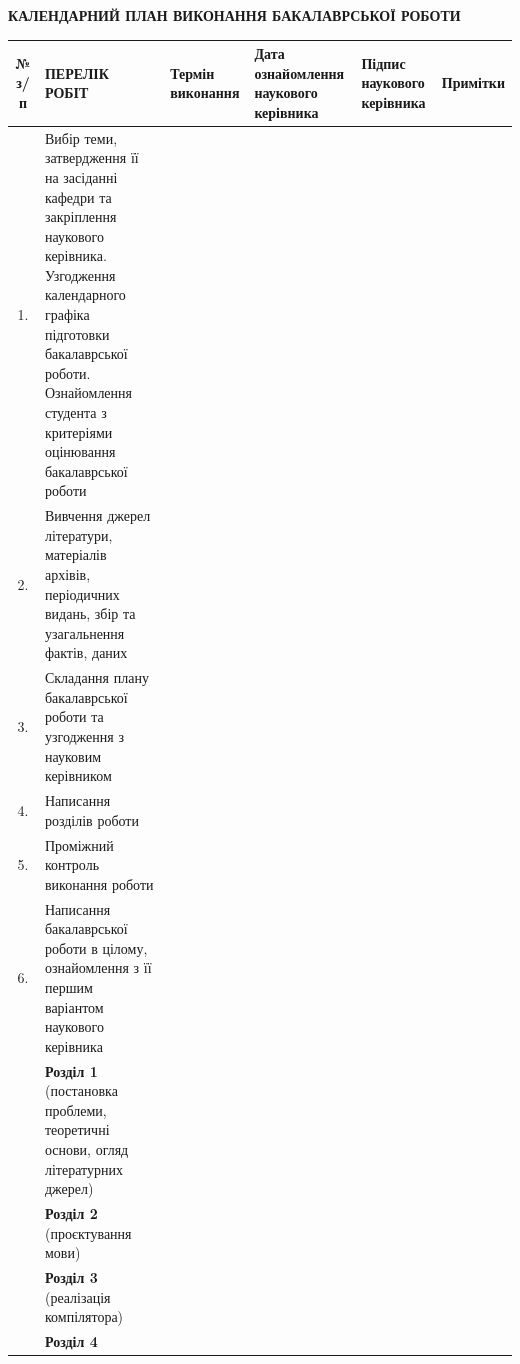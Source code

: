 \begin{landscape}
\begin{center}
    \textbf{КАЛЕНДАРНИЙ ПЛАН ВИКОНАННЯ БАКАЛАВРСЬКОЇ РОБОТИ}\\[1em]
    \begin{singlespace}
    \small
    \renewcommand{\arraystretch}{1.1}
    \begin{tabular}{|c|p{14cm}|p{3cm}|p{2.5cm}|p{2cm}|p{2.25cm}|}
        \hline
        № з/п &
        ПЕРЕЛІК РОБІТ &
        Термін виконання &
        \raggedright Дата ознайомлення наукового керівника &
        \raggedright Підпис наукового керівника &
        Примітки \\
        \hline
        1. & Вибір теми, затвердження її на засіданні кафедри та закріплення наукового керівника.\newline
        Узгодження календарного графіка підготовки бакалаврської роботи.\newline
        Ознайомлення студента з критеріями оцінювання бакалаврської роботи &
        & & & \\
        \hline
        2. & Вивчення джерел літератури, матеріалів архівів, періодичних видань, збір та узагальнення фактів, даних &
        & & & \\
        \hline
        3. & Складання плану бакалаврської роботи та узгодження з науковим керівником &
        & & & \\
        \hline
        4. & Написання розділів роботи &
        & & & \\
        \hline
        5. & Проміжний контроль виконання роботи &
        & & & \\
        \hline
        6. & Написання бакалаврської роботи в цілому, ознайомлення з її першим варіантом наукового керівника &
        & & & \\
        \hline
        & \textbf{Розділ 1}\newline
        (постановка проблеми, теоретичні основи, огляд літературних джерел) &
        & & & \\
        \hline
        & \textbf{Розділ 2}\newline
        (проєктування мови) &
        & & & \\
        \hline
        & \textbf{Розділ 3}\newline
        (реалізація компілятора) &
        & & & \\
        \hline
        & \textbf{Розділ 4}\newline

\end{tabular}
\end{singlespace}
\end{center}
\end{landscape}
